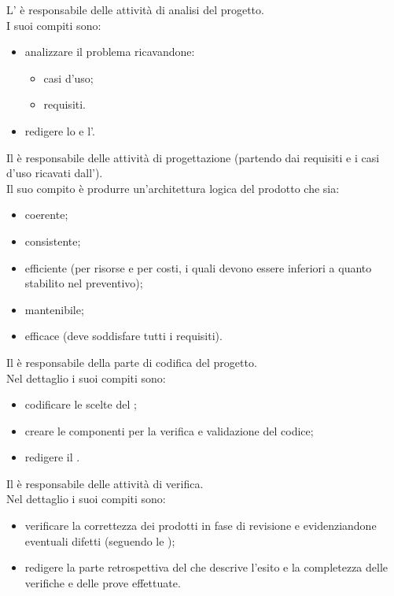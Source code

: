 L'\analProg{} è responsabile delle attività di analisi del progetto.\\I suoi compiti sono:
\begin{itemize}
\item analizzare il problema ricavandone:
\begin{itemize}
\item casi d'uso;
\item requisiti.
\end{itemize}
\item redigere lo \SdF{} e l'\AdR{}.
\end{itemize}  

Il \progetProg{} è responsabile delle attività di progettazione (partendo dai requisiti e i casi d'uso ricavati dall'\analProg{}).\\Il suo compito è produrre un'architettura logica del prodotto che sia:
\begin{itemize}
\item coerente;
\item consistente;
\item efficiente (per risorse e per costi, i quali devono essere inferiori a quanto stabilito nel preventivo);
\item mantenibile;
\item efficace (deve soddisfare tutti i requisiti).
\end{itemize}

Il \programProg{} è responsabile della parte di codifica del progetto.\\Nel dettaglio i suoi compiti sono:
\begin{itemize}
\item codificare le scelte del \progetProg{};
\item creare le componenti per la verifica e validazione del codice;
\item redigere il \MU{}.
\end{itemize}

Il \verifProg{} è responsabile delle attività di verifica.\\Nel dettaglio i suoi compiti sono:
\begin{itemize}
\item verificare la correttezza dei prodotti in fase di revisione e evidenziandone eventuali difetti (seguendo le \NdP{}); 
\item redigere la parte retrospettiva del \PdQ{} che descrive l'esito e la completezza delle verifiche e delle prove effettuate.
\end{itemize}